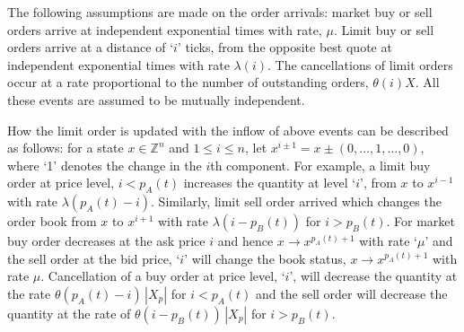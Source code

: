 The following assumptions are made on the order arrivals: market buy or sell orders arrive at independent exponential times with rate, $\mu$. Limit buy or sell orders arrive at a distance of `$i$' ticks, from the opposite best quote at independent exponential times with rate $\lambda(i)$. The cancellations of limit orders occur at a rate proportional to the number of outstanding orders, $\theta(i)X$. All these events are assumed to be mutually independent.


How the limit order is updated with the inflow of above events can be described as follows: for a state $x \in \mathbb{Z}^n$ and $1 \leq i \leq n$, let $x^{i \pm 1}= x \pm (0,\ldots,1,\ldots,0)$, where `1' denotes the change in the $i$th component. For example, a limit buy order at price level, $i < p_A(t)$ increases the quantity at level `$i$', from $x$ to $x^{i-1}$ with rate $\lambda(p_A(t) - i)$. Similarly, limit sell order arrived which changes the order book from $x$ to $x^{i+1}$ with rate $\lambda(i - p_B(t))$ for $i > p_B(t)$. For market buy order decreases at the ask price $i$ and hence $x \to x^{p_A(t)+1}$ with rate `$\mu$' and the sell order at the bid price, `$i$' will change the book status, $x \to x^{p_A(t)+1}$ with rate $\mu$. Cancellation of a buy order at price level, `$i$', will decrease the quantity at the rate $\theta\left(p_A(t) - i \right) \,|X_p|$ for $i < p_A(t)$ and the sell order will decrease the quantity at the rate of $\theta\left(i - p_B(t)\right)\, |X_p|$ for $i > p_B(t)$.


